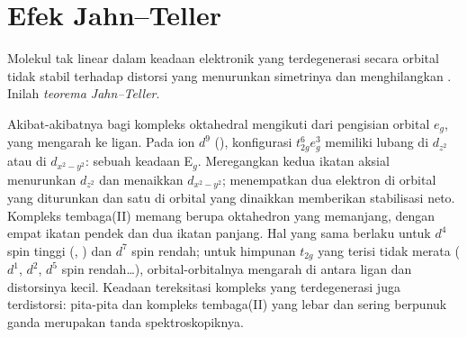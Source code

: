 \section{Efek Jahn--Teller}

\begin{theorem}\label{thm:b3:complex-spectra-magnetism:jahn-teller}
Molekul tak linear dalam keadaan elektronik yang terdegenerasi secara orbital tidak
stabil terhadap distorsi yang menurunkan simetrinya dan menghilangkan
. Inilah \emph{teorema Jahn--Teller}.
\end{theorem}

\admitted

Akibat-akibatnya bagi kompleks oktahedral mengikuti dari pengisian orbital
$e_g$, yang mengarah ke ligan. Pada ion $d^9$ (), konfigurasi
$t_{2g}^6e_g^3$ memiliki lubang di $d_{z^2}$ atau di $d_{x^2-y^2}$: sebuah keadaan E$_g$. Meregangkan kedua ikatan aksial
menurunkan $d_{z^2}$ dan menaikkan $d_{x^2-y^2}$; menempatkan dua elektron di orbital yang diturunkan
dan satu di orbital yang dinaikkan memberikan stabilisasi neto. Kompleks tembaga(II)
memang berupa oktahedron yang memanjang, dengan empat ikatan pendek dan dua ikatan panjang. Hal yang sama berlaku
untuk $d^4$ spin tinggi (, ) dan $d^7$ spin rendah; untuk himpunan $t_{2g}$ yang terisi tidak merata
($d^1$, $d^2$, $d^5$ spin rendah\dots), orbital-orbitalnya mengarah di antara ligan dan
distorsinya kecil. Keadaan tereksitasi kompleks yang terdegenerasi juga terdistorsi: pita-pita
 dan kompleks tembaga(II) yang lebar dan sering berpunuk ganda merupakan
tanda spektroskopiknya.

